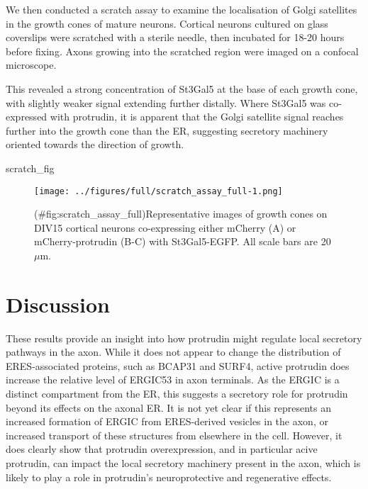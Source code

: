 \documentclass[
  12pt,
  a4paper,
]{book}
\newenvironment{Shaded}{\begin{snugshade}}{\end{snugshade}}
\newcommand{\NormalTok}[1]{#1}
\begin{document}
We then conducted a scratch assay to examine the localisation of Golgi satellites in the growth cones of mature neurons. Cortical neurons cultured on glass coverslips were scratched with a sterile needle, then incubated for 18-20 hours before fixing. Axons growing into the scratched region were imaged on a confocal microscope.

This revealed a strong concentration of St3Gal5 at the base of each growth cone, with slightly weaker signal extending further distally. Where St3Gal5 was co-expressed with protrudin, it is apparent that the Golgi satellite signal reaches further into the growth cone than the ER, suggesting secretory machinery oriented towards the direction of growth.

\begin{Shaded}
\begin{Highlighting}[]
\NormalTok{scratch\_fig}
\end{Highlighting}
\end{Shaded}

\begin{figure}
\centering
\texttt{[image: ../figures/full/scratch\_assay\_full-1.png]}
\caption{(\#fig:scratch\_assay\_full)Representative images of growth cones on DIV15 cortical neurons co-expressing either mCherry (A) or mCherry-protrudin (B-C) with St3Gal5-EGFP. All scale bars are 20\(\mu\)m.}
\end{figure}

\hypertarget{discussion-2}{%
\section{Discussion}\label{discussion-2}}

These results provide an insight into how protrudin might regulate local secretory pathways in the axon. While it does not appear to change the distribution of ERES-associated proteins, such as BCAP31 and SURF4, active protrudin does increase the relative level of ERGIC53 in axon terminals. As the ERGIC is a distinct compartment from the ER, this suggests a secretory role for protrudin beyond its effects on the axonal ER. It is not yet clear if this represents an increased formation of ERGIC from ERES-derived vesicles in the axon, or increased transport of these structures from elsewhere in the cell. However, it does clearly show that protrudin overexpression, and in particular acive protrudin, can impact the local secretory machinery present in the axon, which is likely to play a role in protrudin's neuroprotective and regenerative effects.
\end{document}
